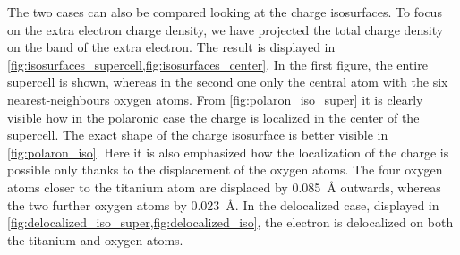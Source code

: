 The two cases can also be compared looking at the charge isosurfaces.
To focus on the extra electron charge density, we have projected the total charge density on the band of the extra electron. The result is displayed in \cref{fig:isosurfaces_supercell,fig:isosurfaces_center}. In the first figure, the entire supercell is shown, whereas in the second one only the central atom with the six nearest-neighbours oxygen atoms. From \cref{fig:polaron_iso_super} it is clearly visible how in the polaronic case the charge is localized in the center of the supercell. The exact shape of the charge isosurface is better visible in \cref{fig:polaron_iso}. Here it is also emphasized how the localization of the charge is possible only thanks to the displacement of the oxygen atoms. The four oxygen atoms closer to the titanium atom are displaced by \SI{0.085}{\angstrom} outwards, whereas the two further oxygen atoms by \SI{0.023}{\angstrom}. In the delocalized case, displayed in \cref{fig:delocalized_iso_super,fig:delocalized_iso}, the electron is delocalized on both the titanium and oxygen atoms.


